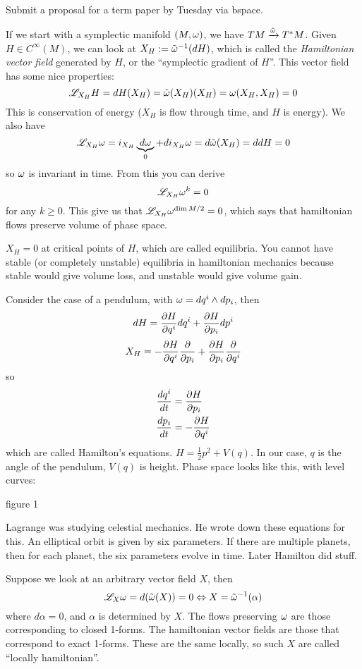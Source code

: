  \setcounter{lecture}{10}

 Submit a proposal for a term paper by Tuesday via bspace.

 If we start with a symplectic manifold $(M,\omega)$, we have
 $TM\xrightarrow{\tilde {\omega}} T^*M$.  Given $H\in C^\infty(M)$, we
 can look at $X_H:=\tilde {\omega}^{-1} (dH)$, which is called the
 \emph{Hamiltonian vector field} generated by $H$, or the
 ``symplectic gradient of $H$''.  This vector field has some nice
 properties:
 \[
   \mathscr{L}_{X_H}H = dH(X_H) = \tilde {\omega} (X_H)(X_H)=\omega(X_H,X_H)=0
 \]
 This is conservation of energy ($X_H$ is flow through time, and
 $H$ is energy).  We also have
 \[
    \mathscr{L}_{X_H}\omega = i_{X_H}\underbrace{d\omega}_0 + di_{X_H}\omega = d\tilde{\omega}(X_H) = ddH=0
 \]
 so $\omega$ is invariant in time.  From this you can derive
 \[
    \mathscr{L}_{X_H}\omega^k=0
 \]
 for any $k\ge 0$.  This give us that $\mathscr{L}_{X_H}\omega^{\dim M/2}=0$,
 which says that hamiltonian flows preserve volume of phase space.

 $X_H=0$ at critical points of $H$, which are called equilibria.
 You cannot have stable (or completely unstable) equilibria in
 hamiltonian mechanics because stable would give volume loss, and
 unstable would give volume gain.

 Consider the case of a pendulum, with $\omega=dq^i\wedge dp_i$, then
 \[
    dH = \frac{\partial H}{\partial q^i}dq^i+\frac{\partial H}{\partial p_i}dp^i
 \]
 \[
    X_H = -\frac{\partial H}{\partial q^i}\frac{\partial }{\partial p_i} + \frac{\partial H}{\partial p_i}\frac{\partial }{\partial q^i}
 \]
 so
 \begin{align*}
   \frac{d q^i}{d t} &= \frac{\partial H}{\partial p_i}\\
   \frac{d p_i}{d t} &= -\frac{\partial H}{\partial q^i}
 \end{align*}
 which are called Hamilton's equations.  $H=\frac{1}{2}p^2+V(q)$.
 In our case, $q$ is the angle of the pendulum, $V(q)$ is height.
 Phase space looks like this, with level curves:

 figure 1

 Lagrange was studying celestial mechanics.  He wrote down these
 equations for this.  An elliptical orbit is given by six
 parameters.  If there are multiple planets, then for each planet,
 the six parameters evolve in time.  Later Hamilton did stuff.

 Suppose we look at an arbitrary vector field $X$, then
 \[
    \mathscr{L}_X \omega  = d(\tilde {\omega}(X))=0\Leftrightarrow
    X=\tilde{\omega}^{-1}(\alpha)
 \]
 where $d\alpha=0$, and $\alpha$ is determined by $X$.  The flows
 preserving $\omega$ are those corresponding to closed 1-forms.  The
 hamiltonian vector fields are those  that correspond to exact
 1-forms.  These are the same locally, so such $X$ are called
 ``locally hamiltonian''.

